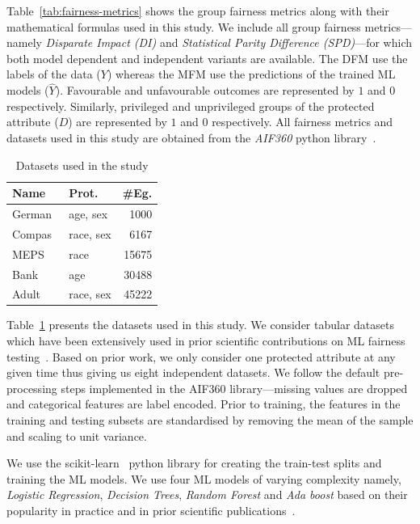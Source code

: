 \documentclass[sigconf,review]{acmart}
\begin{document}
Table \ref{tab:fairness-metrics} shows the group fairness metrics
along with their mathematical formulas used in this study. We include
all group fairness metrics---namely \emph{Disparate Impact (DI)} and
\emph{Statistical Parity Difference (SPD)}---for which both model
dependent and independent variants are available. The DFM use the
labels of the data ($Y$) whereas the MFM use the predictions of the
trained ML models ($\hat{Y}$). Favourable and unfavourable outcomes
are represented by $1$ and $0$ respectively. Similarly, privileged and
unprivileged groups of the protected attribute ($D$) are represented
by $1$ and $0$ respectively. All fairness metrics and datasets used in
this study are obtained from the \emph{AIF360} python
library \cite{bellamy2019ai}.

\begin{table}
  \centering
  \caption{Datasets used in the study}
  \begin{tabular}{l l r}
    \hline
    \textbf{Name} & \textbf{Prot.} & \textbf{\#Eg.}\\
    \hline
    German \cite{hofmann1994german} & age, sex & 1000\\
    Compas\cite{angwin2016machine} & race, sex & 6167\\
    MEPS \cite{mepsdata} & race & 15675\\
    Bank\cite{moro2014data} & age & 30488\\
    Adult\cite{kohavi1996scaling} & race, sex & 45222\\
    \hline
  \end{tabular}
  \label{tab:datasets}
\end{table}

Table \ref{tab:datasets} presents the datasets used in this study. We
consider tabular datasets which have been extensively used in prior
scientific contributions on ML fairness
testing \cite{zhang2021ignorance,biswas2020machine,biswas2021fair,chen2022fairness}. Based
on prior work, we only consider one protected attribute at any given
time thus giving us eight independent datasets. We follow the default
pre-processing steps implemented in the AIF360 library---missing
values are dropped and categorical features are label encoded. Prior
to training, the features in the training and testing subsets are
standardised by removing the mean of the sample and scaling to unit
variance.

We use the scikit-learn \cite{pedregosa2011scikit} python library for
creating the train-test splits and training the ML models. We use four
ML models of varying complexity namely, \emph{Logistic Regression},
\emph{Decision Trees}, \emph{Random Forest} and \emph{Ada boost} based
on their popularity in practice and in prior scientific
publications \cite{zhang2021ignorance,biswas2021fair,biswas2020machine}.
\end{document}
